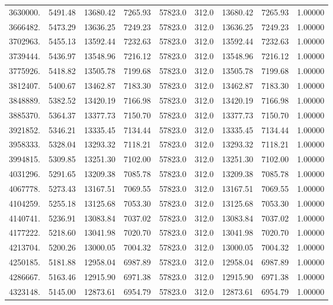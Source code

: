 {\begin{tabular}{rrrrrrrrr}
3630000. & 5491.48& 13680.42 & 7265.93 & 57823.0   & 312.0& 13680.42 & 7265.93 & 1.00000 \\
3666482. & 5473.29& 13636.25 & 7249.23 & 57823.0   & 312.0& 13636.25 & 7249.23 & 1.00000 \\
3702963. & 5455.13& 13592.44 & 7232.63 & 57823.0   & 312.0& 13592.44 & 7232.63 & 1.00000 \\
3739444. & 5436.97& 13548.96 & 7216.12 & 57823.0   & 312.0& 13548.96 & 7216.12 & 1.00000 \\
3775926. & 5418.82& 13505.78 & 7199.68 & 57823.0   & 312.0& 13505.78 & 7199.68 & 1.00000 \\
3812407. & 5400.67& 13462.87 & 7183.30 & 57823.0   & 312.0& 13462.87 & 7183.30 & 1.00000 \\
3848889. & 5382.52& 13420.19 & 7166.98 & 57823.0   & 312.0& 13420.19 & 7166.98 & 1.00000 \\
3885370. & 5364.37& 13377.73 & 7150.70 & 57823.0   & 312.0& 13377.73 & 7150.70 & 1.00000 \\
3921852. & 5346.21& 13335.45 & 7134.44 & 57823.0   & 312.0& 13335.45 & 7134.44 & 1.00000 \\
3958333. & 5328.04& 13293.32 & 7118.21 & 57823.0   & 312.0& 13293.32 & 7118.21 & 1.00000 \\
3994815. & 5309.85& 13251.30 & 7102.00 & 57823.0   & 312.0& 13251.30 & 7102.00 & 1.00000 \\
4031296. & 5291.65& 13209.38 & 7085.78 & 57823.0   & 312.0& 13209.38 & 7085.78 & 1.00000 \\
4067778. & 5273.43& 13167.51 & 7069.55 & 57823.0   & 312.0& 13167.51 & 7069.55 & 1.00000 \\
4104259. & 5255.18& 13125.68 & 7053.30 & 57823.0   & 312.0& 13125.68 & 7053.30 & 1.00000 \\
4140741. & 5236.91& 13083.84 & 7037.02 & 57823.0   & 312.0& 13083.84 & 7037.02 & 1.00000 \\
4177222. & 5218.60& 13041.98 & 7020.70 & 57823.0   & 312.0& 13041.98 & 7020.70 & 1.00000 \\
4213704. & 5200.26& 13000.05 & 7004.32 & 57823.0   & 312.0& 13000.05 & 7004.32 & 1.00000 \\
4250185. & 5181.88& 12958.04 & 6987.89 & 57823.0   & 312.0& 12958.04 & 6987.89 & 1.00000 \\
4286667. & 5163.46& 12915.90 & 6971.38 & 57823.0   & 312.0& 12915.90 & 6971.38 & 1.00000 \\
4323148. & 5145.00& 12873.61 & 6954.79 & 57823.0   & 312.0& 12873.61 & 6954.79 & 1.00000 \\

\end{tabular}}
